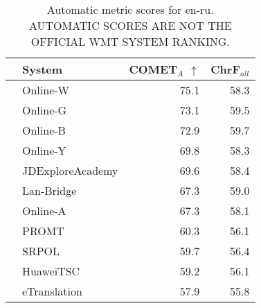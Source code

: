 \begin{table}
\centering
\caption{Automatic metric scores for en-ru. \\AUTOMATIC SCORES ARE NOT THE OFFICIAL WMT SYSTEM RANKING.}
\begin{tabular}{llrr}
\toprule
          &            System &  COMET$_{A}$ $\uparrow$ &  ChrF$_{all}$ \\
\midrule
 \Uncon{} &          Online-W &                    75.1 &          58.3 \\
 \Uncon{} &          Online-G &                    73.1 &          59.5 \\
 \Uncon{} &          Online-B &                    72.9 &          59.7 \\
 \Uncon{} &          Online-Y &                    69.8 &          58.3 \\
 \Const{} &  JDExploreAcademy &                    69.6 &          58.4 \\
 \Uncon{} &        Lan-Bridge &                    67.3 &          59.0 \\
 \Uncon{} &          Online-A &                    67.3 &          58.1 \\
 \Uncon{} &             PROMT &                    60.3 &          56.1 \\
 \Const{} &             SRPOL &                    59.7 &          56.4 \\
 \Const{} &         HuaweiTSC &                    59.2 &          56.1 \\
 \Const{} &      eTranslation &                    57.9 &          55.8 \\
\bottomrule
\end{tabular}
\end{table}



